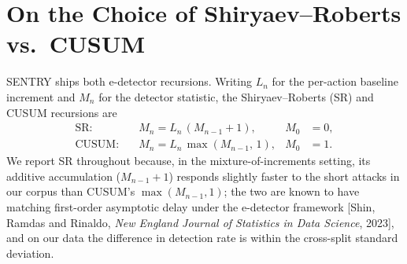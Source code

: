 \documentclass[10pt,journal,compsoc]{IEEEtran}
\begin{document}
\section{On the Choice of Shiryaev--Roberts vs.\ CUSUM}\label{app:srcusum}

SENTRY ships both e-detector recursions. Writing \(L_n\) for the per-action
baseline increment and \(M_n\) for the detector statistic, the
Shiryaev--Roberts (SR) and CUSUM recursions are
\begin{align}
\text{SR:}\quad & M_n = L_n\,(M_{n-1} + 1), & M_0 &= 0, \label{eq:sr}\\
\text{CUSUM:}\quad & M_n = L_n\,\max(M_{n-1},\, 1), & M_0 &= 1. \label{eq:cusum}
\end{align}
We report SR throughout because, in the mixture-of-increments setting, its
additive accumulation (\(M_{n-1}+1\)) responds slightly faster to the short
attacks in our corpus than CUSUM's \(\max(M_{n-1},1)\); the two are known to
have matching first-order asymptotic delay under the e-detector framework
[Shin, Ramdas and Rinaldo, \emph{New England Journal of Statistics in Data
Science}, 2023], and on our data the difference in detection rate is within
the cross-split standard deviation.
\end{document}
